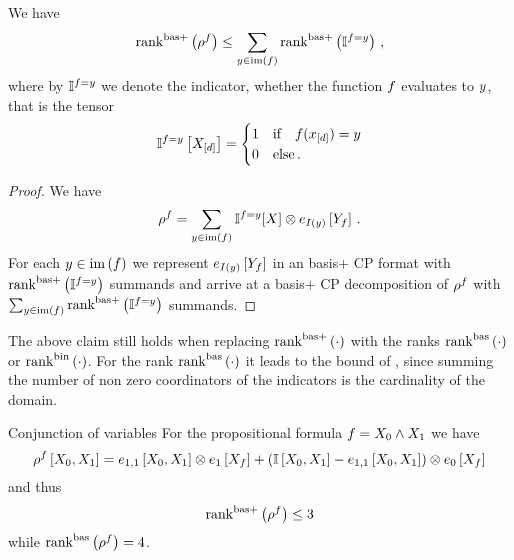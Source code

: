 \begin{theorem}
	We have
		\[ \mathrm{rank}^{\mathrm{bas+}}\left(\rho^{f}\right) \leq  \sum_{y\in\mathrm{im}\left(f\right)} \mathrm{rank}^{\mathrm{bas+}}\left(\mathbb{I}^{f=y} \right) \, , \]
	where by $\mathbb{I}^{f=y}$ we denote the indicator, whether the function $f$ evaluates to $y$, that is the tensor
	\begin{align*}
		\mathbb{I}^{f=y}\left[X_{[d]}\right] =
		\begin{cases}
			1 & \text{if} \quad f(x_{[d]})=y \\
			0 & \text{else} \, .
		\end{cases}
	\end{align*}
\end{theorem}
\begin{proof}
	We have
		\[ \rho^{f} = \sum_{y\in\mathrm{im}\left(f\right)} \mathbb{I}^{f=y}[X]
		\otimes e_{I(y)}\left[Y_{f}\right] \, . \]
	For each $y\in\mathrm{im}\left(f\right)$ we represent $e_{I(y)}\left[Y_{f}\right]$ in an basis+ CP format with $\mathrm{rank}^{\mathrm{bas+}}\left(\mathbb{I}^{f=y} \right) $ summands and arrive at a basis+ CP decomposition of $\rho^{f}$ with $\sum_{y\in\mathrm{im}\left(f\right)} \mathrm{rank}^{\mathrm{bas+}}\left(\mathbb{I}^{f=y} \right) $ summands.
\end{proof}

The above claim still holds when replacing $\mathrm{rank}^{\mathrm{bas+}}\left(\cdot\right)$ with the ranks $\mathrm{rank}^{\mathrm{bas}}\left(\cdot\right)$ or $\mathrm{rank}^{\mathrm{bin}}\left(\cdot\right)$.
For the rank $\mathrm{rank}^{\mathrm{bas}}\left(\cdot\right)$ it leads to the bound of , since summing the number of non zero coordinators of the indicators is the cardinality of the domain.

\begin{example}{Conjunction of variables}
	For the propositional formula $f = X_{0} \land X_{1}$ we have
		\[ \rho^{f}\left[X_{0},X_{1}\right]
		 = e_{1,1}\left[X_{0},X_{1}\right] \otimes e_{1}\left[X_{f}\right]
		  +  (\mathbb{I}\left[X_{0},X_{1}\right] - e_{1,1}\left[X_{0},X_{1}\right]) \otimes e_{0}\left[X_{f}\right]  \]
	and thus 
		\[ \mathrm{rank}^{\mathrm{bas+}}\left(\rho^{f}\right) \leq 3\]
	while $\mathrm{rank}^{\mathrm{bas}}\left(\rho^{f}\right) = 4$.
\end{example}




